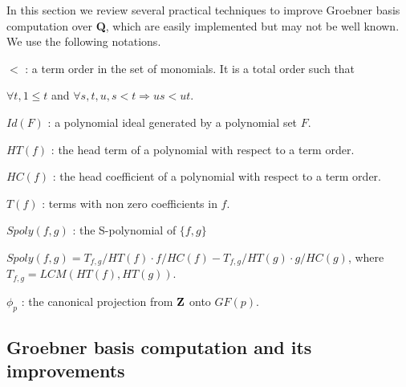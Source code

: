 \documentclass[runningheads]{cl2emult}
\begin{document}
In this section we review several practical techniques to improve
Groebner basis computation over {\bf Q}, which are easily
implemented but may not be well known.
We use the following notations.
\begin{description}
\item $<$ : a term order in the set of monomials. It is a total order such that

 $\forall t, 1 \le t$ and $\forall s, t, u, s<t \Rightarrow us<ut$.
\item $Id(F)$ : a polynomial ideal generated by a polynomial set $F$.
\item $HT(f)$ : the head term of a polynomial with respect to a term order.
\item $HC(f)$ : the head coefficient of a polynomial with respect to a term order.
\item $T(f)$ : terms with non zero coefficients in $f$.
\item $Spoly(f,g)$ : the S-polynomial of $\{f,g\}$ 

$Spoly(f,g) = T_{f,g}/HT(f)\cdot f/HC(f) -T_{f,g}/HT(g)\cdot g/HC(g)$, where
$T_{f,g} = LCM(HT(f),HT(g))$.
\item $\phi_p$ : the canonical projection from ${\bf Z}$ onto $GF(p)$.
\end{description}

\subsection{Groebner basis computation and its improvements}
\end{document}
